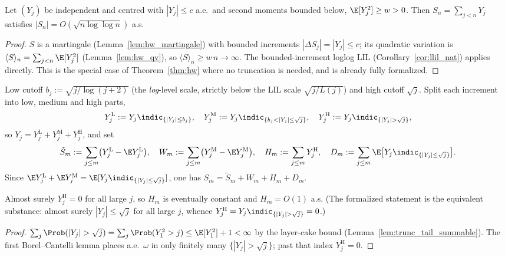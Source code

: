 \begin{corollary}\label{cor:hw_bounded}
Let $(Y_j)$ be independent and centred with $|Y_j|\le c$ a.e.\ and second moments bounded below,
$\E[Y_j^2]\ge w>0$. Then $S_n=\sum_{j<n}Y_j$ satisfies $|S_n|=O(\sqrt{n\log\log n})$ a.s.
\end{corollary}
\begin{proof}
$S$ is a martingale (Lemma~\ref{lem:hw_martingale}) with bounded increments $|\Delta S_j|=|Y_j|\le c$;
its quadratic variation is $\langle S\rangle_n=\sum_{j<n}\E[Y_j^2]$ (Lemma~\ref{lem:hw_qv}), so
$\langle S\rangle_n\ge w\,n\to\infty$. The bounded-increment loglog LIL
(Corollary~\ref{cor:llil_nat}) applies directly. This is the special case of
Theorem~\ref{thm:hw} where no truncation is needed, and is already fully formalized.
\end{proof}

\begin{definition}\label{def:hw_trunc}
Low cutoff $b_j:=\sqrt{j/\log(j+2)}$ (the \emph{log}-level scale, strictly below the LIL
scale $\sqrt{j/L(j)}$) and high cutoff $\sqrt j$. Split each increment into low, medium and
high parts,
\[
  Y_j^{\mathrm L}:=Y_j\indic_{\{|Y_j|\le b_j\}},\quad
  Y_j^{\mathrm M}:=Y_j\indic_{\{b_j<|Y_j|\le\sqrt j\}},\quad
  Y_j^{\mathrm H}:=Y_j\indic_{\{|Y_j|>\sqrt j\}},
\]
so $Y_j=Y_j^{\mathrm L}+Y_j^{\mathrm M}+Y_j^{\mathrm H}$, and set
\[
  \tilde S_m:=\sum_{j\le m}\!\big(Y_j^{\mathrm L}-\E Y_j^{\mathrm L}\big),\quad
  W_m:=\sum_{j\le m}\!\big(Y_j^{\mathrm M}-\E Y_j^{\mathrm M}\big),\quad
  H_m:=\sum_{j\le m}Y_j^{\mathrm H},\quad
  D_m:=\sum_{j\le m}\E\big[Y_j\indic_{\{|Y_j|\le\sqrt j\}}\big].
\]
Since $\E Y_j^{\mathrm L}+\E Y_j^{\mathrm M}=\E[Y_j\indic_{\{|Y_j|\le\sqrt j\}}]$, one has
$S_m=\tilde S_m+W_m+H_m+D_m$.
\end{definition}

\begin{lemma}\label{lem:hw_high}
\leanok
{}
Almost surely $Y_j^{\mathrm H}=0$ for all large $j$, so $H_m$ is eventually constant and
$H_m=O(1)$ a.s. (The formalized statement is the equivalent substance: almost surely
$|Y_j|\le\sqrt j$ for all large $j$, whence $Y_j^{\mathrm H}=Y_j\indic_{\{|Y_j|>\sqrt j\}}=0$.)
\end{lemma}
\begin{proof}\leanok
$\sum_j\Prob(|Y_j|>\sqrt j)=\sum_j\Prob(Y_1^2>j)\le\E[Y_1^2]+1<\infty$ by the layer-cake
bound (Lemma~\ref{lem:trunc_tail_summable}). The first Borel--Cantelli lemma places a.e.\
$\omega$ in only finitely many $\{|Y_j|>\sqrt j\}$; past that index $Y_j^{\mathrm H}=0$.
\end{proof}


